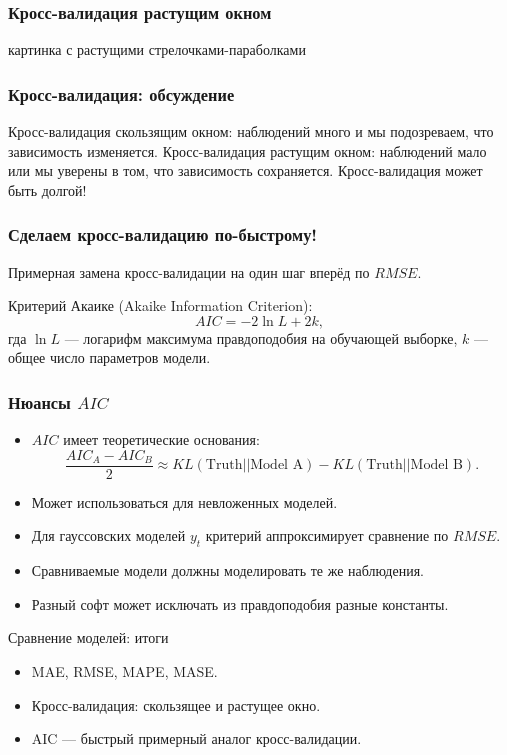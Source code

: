 \begin{frame}
    \frametitle{Кросс-валидация растущим окном}

    картинка с растущими стрелочками-параболками

\end{frame}


\begin{frame}
    \frametitle{Кросс-валидация: обсуждение}

    Кросс-валидация \alert{скользящим} окном: наблюдений много и мы подозреваем, что 
    зависимость изменяется.
    \pause
    Кросс-валидация \alert{растущим} окном: наблюдений мало или мы уверены 
    в том, что зависимость сохраняется.
    \pause
    Кросс-валидация может быть \alert{долгой}!

\end{frame}

\begin{frame}
    \frametitle{Сделаем кросс-валидацию по-быстрому!}

    Примерная замена кросс-валидации на один шаг вперёд по $RMSE$.

    \alert{Критерий Акаике} (Akaike Information Criterion):
    \pause
    \[
      AIC = -2 \ln L + 2k,
    \]
    гда $\ln L$ — логарифм максимума правдоподобия на обучающей выборке, $k$ — общее число параметров модели. 
    
\end{frame}

\begin{frame}
    \frametitle{Нюансы $AIC$}

    \begin{itemize}[<+->]
        \item $AIC$ имеет \alert{теоретические основания}:
        \[
            \frac{AIC_A - AIC_B}{2} \approx KL(\text{Truth} || \text{Model A}) - KL(\text{Truth} || \text{Model B}).
        \]
        \item Может использоваться \alert{для невложенных моделей}. 
        \item Для гауссовских моделей $y_t$ критерий аппроксимирует \alert{сравнение по $RMSE$}.
        \item Сравниваемые модели должны моделировать \alert{те же} наблюдения. 
        \item Разный софт может исключать из правдоподобия \alert{разные константы}. 
    \end{itemize}

    

\end{frame}


\begin{frame}{Сравнение моделей: итоги}

  \begin{itemize}[<+->]
    \item MAE, RMSE, MAPE, MASE.
    \item Кросс-валидация: скользящее и растущее окно.
    \item AIC — быстрый примерный аналог кросс-валидации. 
  \end{itemize}
\end{frame}



